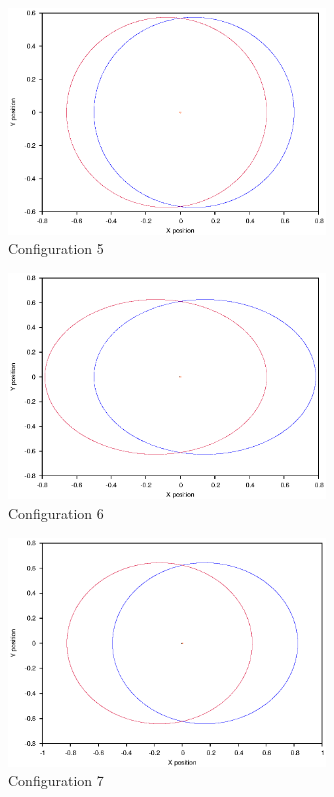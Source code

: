 \documentclass[a4paper,12pt]{article}
\begin{document}
\begin{figure}[H]
\centering
\includegraphics[width=0.75\textwidth]{./results/004-55-004/Orbit.eps}
\caption{Configuration 5}
\label{fig:config5}
\end{figure}
\begin{figure}[H]
\centering
\includegraphics[width=0.75\textwidth]{./results/004-57-004/Orbit.eps}
\caption{Configuration 6}
\label{fig:config6}
\end{figure}
\begin{figure}[H]
\centering
\includegraphics[width=0.75\textwidth]{./results/005-58-005-3/Orbit.eps}
\caption{Configuration 7}
\label{fig:config7}
\end{figure}
\end{document}
